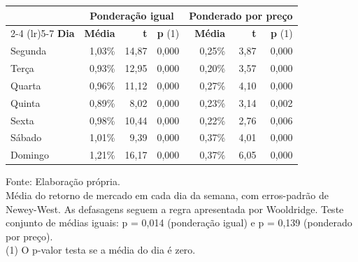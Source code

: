 \begingroup
\setlength{}
\setlength{}
\fontsize{12.0pt}{14.4pt}\selectfont

\setlength{\LTpost}{0mm}
\begin{longtable}{@{\extracolsep{\fill}}lrrrrrr}

\toprule
 & \multicolumn{3}{c}{\textbf{Ponderação igual}} & \multicolumn{3}{c}{\textbf{Ponderado por preço}} \\ 
\cmidrule(lr){2-4} \cmidrule(lr){5-7}
\textbf{Dia} & \textbf{Média} & \textbf{t} & \textbf{p} (1) & \textbf{Média} & \textbf{t} & \textbf{p} (1) \\ 
\midrule\addlinespace[2.5pt]
Segunda & 1,03\% & 14,87 & 0,000 & 0,25\% & 3,87 & 0,000 \\
Terça & 0,93\% & 12,95 & 0,000 & 0,20\% & 3,57 & 0,000 \\
Quarta & 0,96\% & 11,12 & 0,000 & 0,27\% & 4,10 & 0,000 \\
Quinta & 0,89\% & 8,02 & 0,000 & 0,23\% & 3,14 & 0,002 \\
Sexta & 0,98\% & 10,44 & 0,000 & 0,22\% & 2,76 & 0,006 \\
Sábado & 1,01\% & 9,39 & 0,000 & 0,37\% & 4,01 & 0,000 \\
Domingo & 1,21\% & 16,17 & 0,000 & 0,37\% & 6,05 & 0,000 \\
\bottomrule
\end{longtable}
\begin{minipage}{\linewidth}
Fonte: Elaboração própria.\\
Média do retorno de mercado em cada dia da semana, com erros-padrão de Newey-West. As defasagens seguem a regra apresentada por Wooldridge. Teste conjunto de médias iguais: p = 0,014 (ponderação igual) e p = 0,139 (ponderado por preço).\\
(1) O p-valor testa se a média do dia é zero.\\
\end{minipage}
\endgroup
